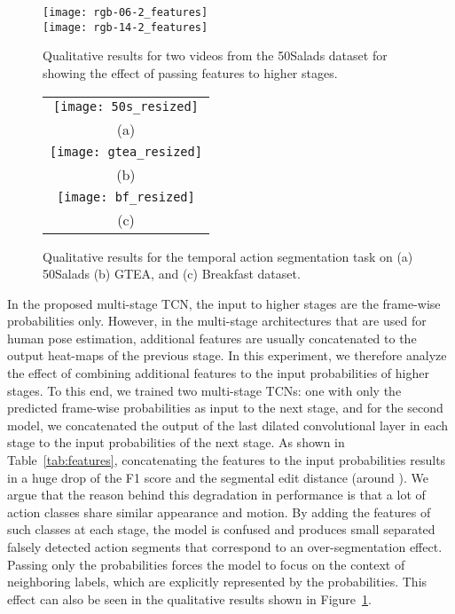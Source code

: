 \documentclass[10pt,twocolumn,letterpaper]{article}
\begin{document}
\begin{figure}[tb]
\begin{center}
   \texttt{[image: rgb-06-2\_features]}
   \\
   \texttt{[image: rgb-14-2\_features]}
\end{center}
   \caption{Qualitative results for two videos from the 50Salads dataset for showing the effect 
   of passing features to higher stages.}
\label{fig:features}
\end{figure}
\begin{figure*}[tb]
\begin{center}
\begin{tabular}{c}
   \texttt{[image: 50s\_resized]}
  	\\
  	(a) 
  	\\
  	\texttt{[image: gtea\_resized]}
  	\\
  	(b) 
  	\\
  	\texttt{[image: bf\_resized]}
  	\\
  	(c) 
\end{tabular}
\end{center}
   \caption{Qualitative results for the temporal action segmentation task on (a) 50Salads 
   (b) GTEA, and (c) Breakfast dataset.}
\label{fig:qualitative_res}
\end{figure*}
In the proposed multi-stage TCN, the input to higher stages are the 
frame-wise probabilities only. However, in the multi-stage architectures 
that are used for human pose estimation, additional features are 
usually concatenated to the output heat-maps of the previous stage.  
In this experiment, we therefore analyze the effect of combining additional 
features to the input probabilities of higher stages. To this end, we trained 
two multi-stage TCNs: one with only the predicted frame-wise probabilities 
as input to the next stage, and for the second model, we concatenated the output 
of the last dilated convolutional layer in each stage to the input probabilities 
of the next stage. As shown in Table~\ref{tab:features}, concatenating 
the features to the input probabilities results in a huge drop of the F1 score 
and the segmental edit distance (around ). We argue that the reason behind this 
degradation in performance is that a lot of action classes share similar appearance 
and motion. By adding the features of such classes at each stage, the model 
is confused and produces small separated falsely detected action segments 
that correspond to an over-segmentation effect. Passing only the probabilities 
forces the model to focus on the context of neighboring labels, which are explicitly 
represented by the probabilities. This effect can also be seen in the qualitative 
results shown in Figure~\ref{fig:features}.
\end{document}
